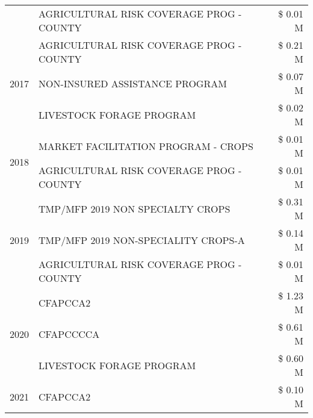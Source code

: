 \begin{tabular}{llr}
 & AGRICULTURAL RISK COVERAGE PROG - COUNTY & \$ 0.01 M \\
\cline{1-3}
\multirow[t]{3}{*}{2017} & AGRICULTURAL RISK COVERAGE PROG - COUNTY & \$ 0.21 M \\
 & NON-INSURED ASSISTANCE PROGRAM & \$ 0.07 M \\
 & LIVESTOCK FORAGE PROGRAM & \$ 0.02 M \\
\cline{1-3}
\multirow[t]{2}{*}{2018} & MARKET FACILITATION PROGRAM - CROPS & \$ 0.01 M \\
 & AGRICULTURAL RISK COVERAGE PROG - COUNTY & \$ 0.01 M \\
\cline{1-3}
\multirow[t]{3}{*}{2019} & TMP/MFP 2019 NON SPECIALTY CROPS & \$ 0.31 M \\
 & TMP/MFP 2019 NON-SPECIALITY CROPS-A & \$ 0.14 M \\
 & AGRICULTURAL RISK COVERAGE PROG - COUNTY & \$ 0.01 M \\
\cline{1-3}
\multirow[t]{3}{*}{2020} & CFAPCCA2 & \$ 1.23 M \\
 & CFAPCCCCA & \$ 0.61 M \\
 & LIVESTOCK FORAGE PROGRAM & \$ 0.60 M \\
\cline{1-3}
2021 & CFAPCCA2 & \$ 0.10 M \\
\cline{1-3}
\bottomrule
\end{tabular}
